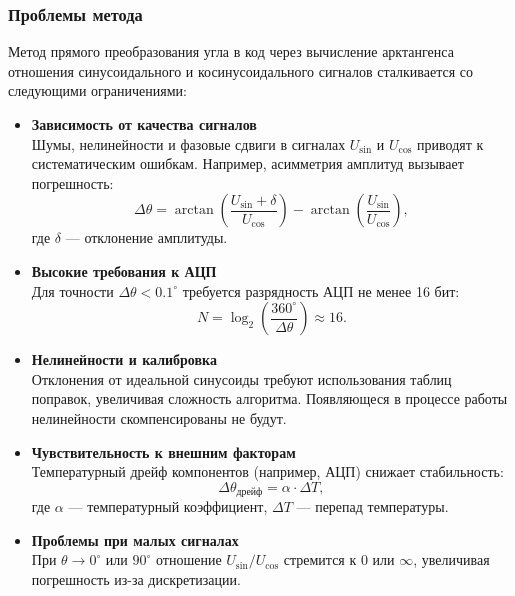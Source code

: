 \subsubsection{Проблемы метода}
Метод прямого преобразования угла в код через вычисление арктангенса отношения синусоидального и косинусоидального сигналов сталкивается со следующими ограничениями:
\begin{itemize}
    \item \textbf{Зависимость от качества сигналов} \\
    Шумы, нелинейности и фазовые сдвиги в сигналах \( U_{\sin} \) и \( U_{\cos} \) приводят к систематическим ошибкам. Например, асимметрия амплитуд вызывает погрешность:
    \begin{equation}
    \Delta\theta = \arctan\left(\frac{U_{\sin} + \delta}{U_{\cos}}\right) - \arctan\left(\frac{U_{\sin}}{U_{\cos}}\right),
    \end{equation}
    где \(\delta\) — отклонение амплитуды.

    \item \textbf{Высокие требования к АЦП} \\
    Для точности \(\Delta\theta < 0.1^\circ\) требуется разрядность АЦП не менее 16 бит:
    \begin{equation}
    N = \log_2\left(\frac{360^\circ}{\Delta\theta}\right) \approx 16.
    \end{equation}

    \item \textbf{Нелинейности и калибровка} \\
    Отклонения от идеальной синусоиды требуют использования таблиц поправок, увеличивая сложность алгоритма. 
    Появляющеся в процессе работы нелинейности скомпенсированы не будут.

    \item \textbf{Чувствительность к внешним факторам} \\
    Температурный дрейф компонентов (например, АЦП) снижает стабильность:
    \begin{equation}
    \Delta\theta_{\text{дрейф}} = \alpha \cdot \Delta T,
    \end{equation}
    где \(\alpha\) — температурный коэффициент, \(\Delta T\) — перепад температуры.

    \item \textbf{Проблемы при малых сигналах} \\
    При \(\theta \to 0^\circ\) или \(90^\circ\) отношение \( U_{\sin}/U_{\cos} \) стремится к \(0\) или \(\infty\), увеличивая погрешность из-за дискретизации.
\end{itemize}

